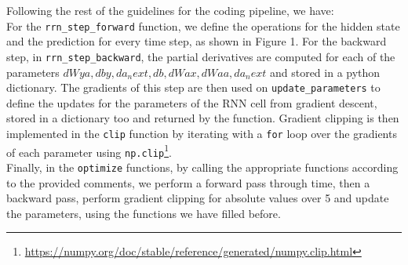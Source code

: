 \documentclass{article}
\def\code#1{\texttt{#1}}
\begin{document}
Following the rest of the guidelines for the coding pipeline, we have: \\

For the \code{rrn\_step\_forward} function, we define the operations for the hidden state and the prediction for every time step, as shown in Figure 1. For the backward step, in \code{rrn\_step\_backward}, the partial derivatives are computed for each of the parameters $dWya, dby, da_next, db, dWax, dWaa, da_next$ and stored in a python dictionary. The gradients of this step are then used on \code{update\_parameters} to define the updates for the parameters of the RNN cell from gradient descent, stored in a dictionary too and returned by the function. Gradient clipping is then implemented in the \code{clip} function by iterating with a \code{for} loop over the gradients of each parameter using \code{np.clip}\footnote{\url{https://numpy.org/doc/stable/reference/generated/numpy.clip.html}}. \\

Finally, in the \code{optimize} functions, by calling the appropriate functions according to the provided comments, we perform a forward pass through time, then a backward pass, perform gradient clipping for absolute values over 5 and update the parameters, using the functions we have filled before.
\end{document}
